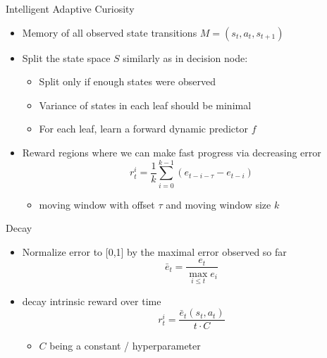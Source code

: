 \documentclass[aspectratio=169]{../latex_main/tntbeamer}  %
\begin{document}
\begin{frame}[c]{Intelligent Adaptive Curiosity~}
	
	\begin{itemize}
		\item Memory of all observed state transitions $M = (s_t, a_t, s_{t+1})$
		\item Split the state space $S$ similarly as in decision node:
		\begin{itemize}
			\item Split only if enough states were observed
			\item Variance of states in each leaf should be minimal
			\item For each leaf, learn a forward dynamic predictor $f$
		\end{itemize}
		\item Reward regions where we can make fast progress via decreasing error
		$$r_t^i = \frac{1}{k} \sum_{i=0}^{k-1} (e_{t-i-\tau} - e_{t-i})$$
		\begin{itemize}
			\item moving window with offset $\tau$ and moving window size $k$
		\end{itemize}
		
	\end{itemize}
	
	
\end{frame}
\begin{frame}[c]{Decay~}
	
	\begin{itemize}
		\item Normalize error to [0,1] by the maximal error observed so far
		$$\bar{e}_t = \frac{e_t}{\max_{i \leq t} e_i} $$
		\item decay intrinsic reward over time
		$$r_t^i = \frac{\bar{e}_t(s_t, a_t)}{t \cdot C}$$ 
		\begin{itemize}
			\item $C$ being a constant / hyperparameter
		\end{itemize}
	\end{itemize}

	
\end{frame}
\end{document}
